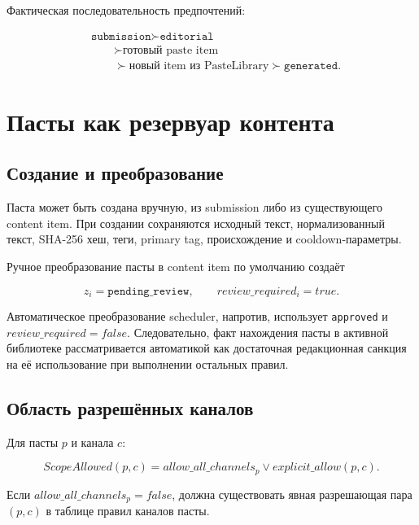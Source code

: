 \documentclass[12pt,a4paper]{article}
\newcommand{\Status}[1]{\texttt{#1}}
\newcommand{\Source}[1]{\texttt{#1}}
\begin{document}
Фактическая последовательность предпочтений:

\begin{equation}
  \begin{aligned}
    &\Source{submission}\succ \Source{editorial}\\
    &\qquad\succ\text{готовый paste item}\\
    &\qquad\succ\text{новый item из PasteLibrary}\succ \Source{generated}.
  \end{aligned}
  \label{eq:actual-priority}
\end{equation}

\section{Пасты как резервуар контента}

\subsection{Создание и преобразование}

Паста может быть создана вручную, из submission либо из существующего content
item. При создании сохраняются исходный текст, нормализованный текст, SHA-256
хеш, теги, primary tag, происхождение и cooldown-параметры.

Ручное преобразование пасты в content item по умолчанию создаёт

\begin{equation}
  z_i=\Status{pending\_review},
  \qquad review\_required_i=true.
\end{equation}

Автоматическое преобразование scheduler, напротив, использует
\Status{approved} и $review\_required=false$. Следовательно, факт нахождения
пасты в активной библиотеке рассматривается автоматикой как достаточная
редакционная санкция на её использование при выполнении остальных правил.

\subsection{Область разрешённых каналов}

Для пасты $p$ и канала $c$:

\begin{equation}
  ScopeAllowed(p,c)=
  allow\_all\_channels_p
  \lor explicit\_allow(p,c).
  \label{eq:paste-scope}
\end{equation}

Если $allow\_all\_channels_p=false$, должна существовать явная разрешающая
пара $(p,c)$ в таблице правил каналов пасты.
\end{document}
